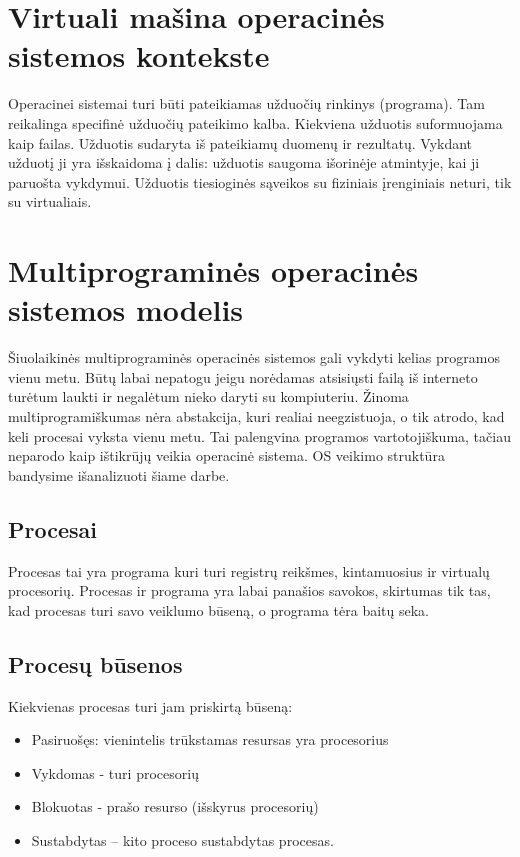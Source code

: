\documentclass[oneside]{VUMIFPSkursinis}
\begin{document}
	\section{Virtuali mašina operacinės sistemos kontekste}
	Operacinei sistemai turi būti pateikiamas užduočių rinkinys (programa). Tam reikalinga specifinė užduočių pateikimo kalba. Kiekviena užduotis suformuojama kaip failas. Užduotis sudaryta iš pateikiamų duomenų ir rezultatų. Vykdant užduotį ji yra išskaidoma į dalis: užduotis saugoma išorinėje atmintyje, kai ji paruošta vykdymui. Užduotis tiesioginės sąveikos su fiziniais įrenginiais neturi, tik su virtualiais.

\section{Multiprograminės operacinės sistemos modelis}
Šiuolaikinės multiprograminės operacinės sistemos gali vykdyti kelias programos vienu metu. Būtų labai nepatogu jeigu norėdamas atsisiųsti failą iš interneto turėtum laukti ir negalėtum nieko daryti su kompiuteriu. Žinoma multiprogramiškumas nėra abstakcija, kuri realiai neegzistuoja, o tik atrodo, kad keli procesai vyksta vienu metu. Tai palengvina programos vartotojiškuma, tačiau neparodo kaip ištikrūjų veikia operacinė sistema. OS veikimo struktūra bandysime išanalizuoti šiame darbe. 

\subsection{Procesai}
Procesas tai yra programa kuri turi registrų reikšmes, kintamuosius ir virtualų procesorių. Procesas ir programa yra labai panašios savokos, skirtumas tik tas, kad procesas turi savo veiklumo būseną, o programa tėra baitų seka.

\subsection{Procesų būsenos}
Kiekvienas procesas turi jam priskirtą būseną:
\begin{itemize}
\item Pasiruošęs: vienintelis trūkstamas resursas yra procesorius
\item Vykdomas - turi procesorių
\item Blokuotas - prašo resurso (išskyrus procesorių) 
\item Sustabdytas – kito proceso sustabdytas procesas.

\end{itemize}
\end{document}
